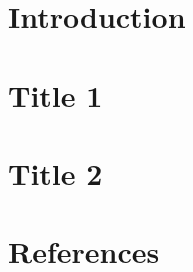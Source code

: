 \documentclass[12pt]{article}
\begin{document}
	
	\tableofcontents	
	\pagebreak
	


\section{Introduction}



\section{Title 1}

\newpage
\section{Title 2 }

\newpage




\newpage

\section{References}




%





	
%	
%		
%		
%		
%		
%		
	
	
	
\end{document}
